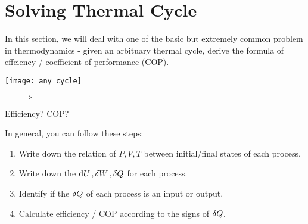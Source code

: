 \documentclass[class=article, crop=false, 12pt]{standalone}
\begin{document}
\linesep
\newpage
\section{Solving Thermal Cycle}

In this section, 
we will deal with one of the basic but extremely common problem in thermodynamics - 
given an arbituary thermal cycle, 
derive the formula of effciency / coefficient of performance (COP). 

\begin{center}
    \begin{minipage}{0.2\linewidth}
        \centering
        \texttt{[image: any\_cycle]}
    \end{minipage}
    $\qquad\Rightarrow\qquad$
    \begin{minipage}{0.25\linewidth}
        \centering
        Efficiency? COP?
    \end{minipage}
\end{center}


In general, you can follow these steps:
\begin{notation}[]
    \begin{enumerate}
        \item Write down the relation of $P,V,T$ between initial/final states of each process.
        \item Write down the $\dd{U}, \var{W}, \var{Q}$ for each process. 
        \item Identify if the $\var{Q}$ of each process is an input or output.
        \item Calculate efficiency / COP according to the signs of $\var{Q}$.
    \end{enumerate}
\end{notation}
\end{document}
